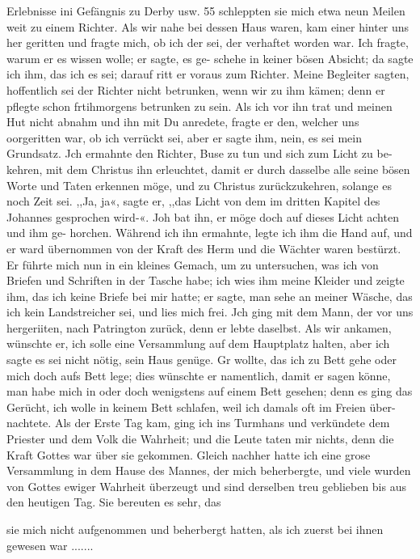 Erlebnisse ini Gefängnis zu Derby usw. 55
schleppten sie mich etwa neun Meilen weit zu einem Richter.
Als wir nahe bei dessen Haus waren, kam einer hinter uns her
geritten und fragte mich, ob ich der sei, der verhaftet worden
war. Ich fragte, warum er es wissen wolle; er sagte, es ge-
schehe in keiner bösen Absicht; da sagte ich ihm, das ich es
sei; darauf ritt er voraus zum Richter. Meine Begleiter sagten,
hoffentlich sei der Richter nicht betrunken, wenn wir zu ihm
kämen; denn er pflegte schon frtihmorgens betrunken zu sein.
Als ich vor ihn trat und meinen Hut nicht abnahm und ihn mit
Du anredete, fragte er den, welcher uns oorgeritten war, ob ich
verrückt sei, aber er sagte ihm, nein, es sei mein Grundsatz. Jch
ermahnte den Richter, Buse zu tun und sich zum Licht zu be-
kehren, mit dem Christus ihn erleuchtet, damit er durch dasselbe
alle seine bösen Worte und Taten erkennen möge, und zu Christus
zurückzukehren, solange es noch Zeit sei. ,,Ja, ja«, sagte er, ,,das
Licht von dem im dritten Kapitel des Johannes gesprochen wird-«.
Joh bat ihn, er möge doch auf dieses Licht achten und ihm ge-
horchen. Während ich ihn ermahnte, legte ich ihm die Hand auf,
und er ward übernommen von der Kraft des Herm und die
Wächter waren bestürzt. Er führte mich nun in ein kleines Gemach,
um zu untersuchen, was ich von Briefen und Schriften in der
Tasche habe; ich wies ihm meine Kleider und zeigte ihm, das
ich keine Briefe bei mir hatte; er sagte, man sehe an meiner
Wäsche, das ich kein Landstreicher sei, und lies mich frei. Jch
ging mit dem Mann, der vor uns hergeriiten, nach Patrington
zurück, denn er lebte daselbst. Als wir ankamen, wünschte er, ich
solle eine Versammlung auf dem Hauptplatz halten, aber ich sagte
es sei nicht nötig, sein Haus genüge. Gr wollte, das ich zu Bett
gehe oder mich doch aufs Bett lege; dies wünschte er namentlich,
damit er sagen könne, man habe mich in oder doch wenigstens
auf einem Bett gesehen; denn es ging das Gerücht, ich wolle
in keinem Bett schlafen, weil ich damals oft im Freien über-
nachtete. Als der Erste Tag kam, ging ich ins Turmhans
und verkündete dem Priester und dem Volk die Wahrheit; und
die Leute taten mir nichts, denn die Kraft Gottes war über sie
gekommen. Gleich nachher hatte ich eine grose Versammlung in
dem Hause des Mannes, der mich beherbergte, und viele wurden
von Gottes ewiger Wahrheit überzeugt und sind derselben treu
geblieben bis aus den heutigen Tag. Sie bereuten es sehr, das


sie mich nicht aufgenommen und beherbergt hatten, als ich zuerst
bei ihnen gewesen war .......

